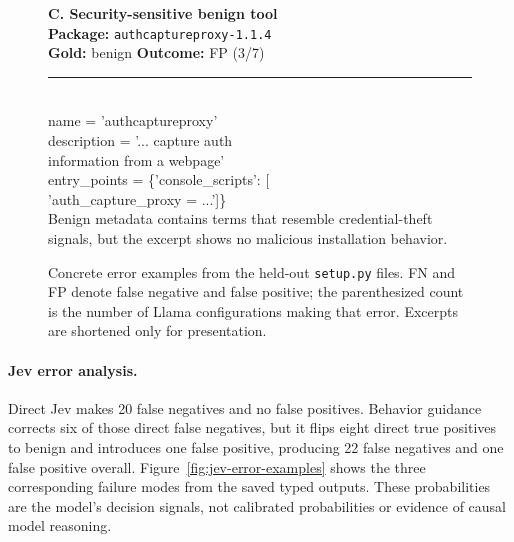 \begin{figure}[!ht]
{    \begin{minipage}[t]{0.30\textwidth}
        \vspace{0.5ex}
        \textbf{C. Security-sensitive benign tool}\\[-0.25ex]
        \scriptsize\textbf{Package:} \texttt{authcaptureproxy-1.1.4}\\
        \scriptsize\textbf{Gold:} benign \quad \textbf{Outcome:} FP (3/7)\\[0.75ex]
        \rule{\linewidth}{0.3pt}\\[-0.5ex]
        \footnotesize\ttfamily
        name = 'authcaptureproxy'\\
        description = '... capture auth\\
        information from a webpage'\\
        entry\_points = \{'console\_scripts': [\\
        \quad 'auth\_capture\_proxy = ...']\}\\[0.75ex]
        \normalfont\scriptsize
        Benign metadata contains terms that resemble credential-theft signals,
        but the excerpt shows no malicious installation behavior.
        \vspace{0.5ex}
    \end{minipage}}
    \caption{Concrete error examples from the held-out \texttt{setup.py}
    files. FN and FP denote false negative and false positive;
    the parenthesized count is the number of Llama configurations making that
    error. Excerpts are shortened only for presentation.}
    \label{fig:error-examples}
\end{figure}

\paragraph{Jev error analysis.} Direct Jev makes 20 false negatives and no
false positives. Behavior guidance corrects six of those direct false
negatives, but it flips eight direct true positives to benign and introduces
one false positive, producing 22 false negatives and one false positive
overall. Figure~\ref{fig:jev-error-examples} shows the three corresponding
failure modes from the saved typed outputs. These probabilities are the model's
decision signals, not calibrated probabilities or evidence of causal model
reasoning.

